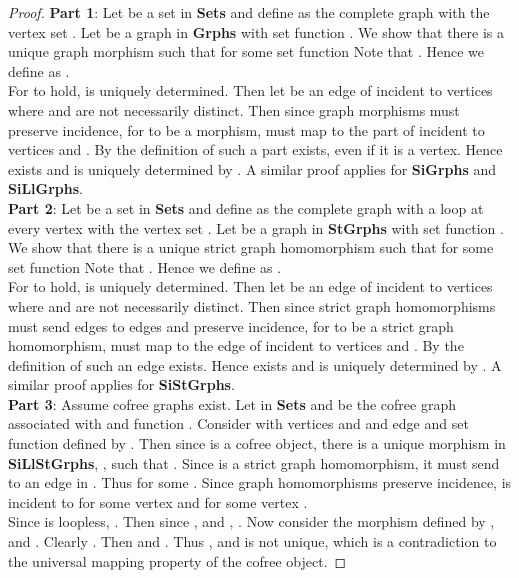 \documentclass[11pt]{article}
\begin{document}
\begin{proof}
\textbf{Part 1}: Let  be a set in \textbf{Sets} and define  as the complete graph with the vertex set . Let  be a graph in \textbf{Grphs} with set function . We show that there is a unique graph morphism  such that  for some set function   Note that . Hence we define  as .\\
\indent For  to hold,  is uniquely determined. Then let  be an edge of  incident to vertices  where  and  are not necessarily distinct. Then since graph morphisms must preserve incidence, for  to be a morphism,  must map to the part  of  incident to vertices  and . By the definition of  such a part  exists, even if it is a vertex. Hence  exists and is uniquely determined by . A similar proof applies for \textbf{SiGrphs} and \textbf{SiLlGrphs}.\\
\indent \textbf{Part 2}: Let  be a set in \textbf{Sets} and define  as the complete graph with a loop at every vertex with the vertex set . Let  be a graph in \textbf{StGrphs} with set function . We show that there is a unique strict graph homomorphism  such that  for some set function   Note that . Hence we define  as .\\
\indent For  to hold,  is uniquely determined. Then let  be an edge of  incident to vertices  where  and  are not necessarily distinct. Then since strict graph homomorphisms must send edges to edges and preserve incidence, for  to be a strict graph homomorphism,  must map to the edge  of  incident to vertices  and . By the definition of  such an edge  exists. Hence  exists and is uniquely determined by . A similar proof applies for \textbf{SiStGrphs}. \\
\indent \textbf{Part 3}: Assume cofree graphs exist. Let  in \textbf{Sets} and  be the cofree graph associated with  and function . Consider  with vertices  and  and edge  and set function  defined by . Then since  is a cofree object, there is a unique morphism in \textbf{SiLlStGrphs}, , such that . Since  is a strict graph homomorphism, it must send  to an edge in . Thus  for some . Since graph homomorphisms preserve incidence,  is incident to  for some vertex  and  for some vertex .\\
\indent Since  is loopless, . Then since ,  and , . Now consider the morphism  defined by ,  and . Clearly . Then  and . Thus , and  is not unique, which is a contradiction to the universal mapping property of the cofree object.
\end{proof}
\end{document}

